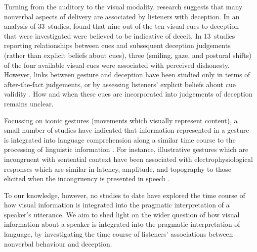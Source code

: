 \documentclass[a4paper,man,natbib]{apa6}
\begin{document}
Turning from the auditory to the visual modality, research suggests that many nonverbal aspects of delivery are associated by listeners with deception. 
In an analysis of 33~studies, \citet{Zuckerman1981} found that nine out of the ten visual cues-to-deception that were investigated were believed to be indicative of deceit. 
In 13~studies reporting relationships between cues and subsequent deception judgements (rather than explicit beliefs about cues), three (smiling, gaze, and postural shifts) of the four available visual cues were associated with perceived dishonesty.
However, links between gesture and deception have been studied only in terms of after-the-fact judgements, or by assessing listeners' explicit beliefs about cue validity \citep[see][]{Vrij1996a, Zuckerman1981a}.
How and when these cues are incorporated into judgements of deception remains unclear. 

Focussing on iconic gestures (movements which visually represent content), a small number of studies have indicated that information represented in a gesture is integrated into language comprehension along a similar time course to the processing of linguistic information \citep[See e.g.][]{Ozyurek2007, Kelly2004}. 
For instance, illustrative gestures which are incongruent with sentential context have been associated with electrophysiological responses which are similar in latency, amplitude, and topography to those elicited when the incongruency is presented in speech \citep{Ozyurek2007}.

To our knowledge, however, no studies to date have explored the time course of how visual information is integrated into the pragmatic interpretation of a speaker's utterance.
We aim to shed light on the wider question of how visual information about a speaker is integrated into the pragmatic interpretation of language, by investigating the time course of listeners' associations between nonverbal behaviour and deception.




\end{document}
